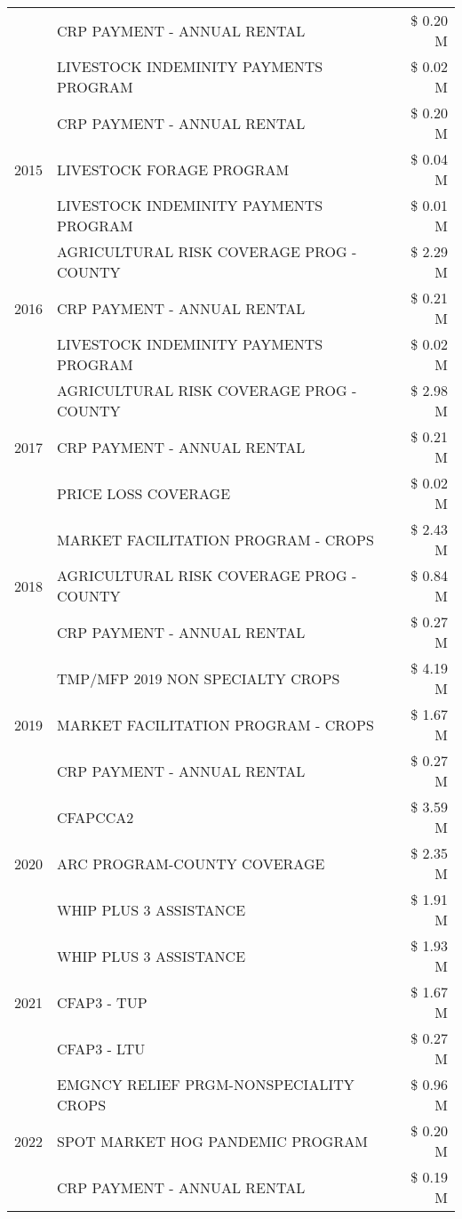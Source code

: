\begin{tabular}{llr}
 & CRP PAYMENT - ANNUAL RENTAL & \$ 0.20 M \\
 & LIVESTOCK INDEMINITY PAYMENTS PROGRAM & \$ 0.02 M \\
\cline{1-3}
\multirow[t]{3}{*}{2015} & CRP PAYMENT - ANNUAL RENTAL & \$ 0.20 M \\
 & LIVESTOCK FORAGE PROGRAM & \$ 0.04 M \\
 & LIVESTOCK INDEMINITY PAYMENTS PROGRAM & \$ 0.01 M \\
\cline{1-3}
\multirow[t]{3}{*}{2016} & AGRICULTURAL RISK COVERAGE PROG - COUNTY & \$ 2.29 M \\
 & CRP PAYMENT - ANNUAL RENTAL & \$ 0.21 M \\
 & LIVESTOCK INDEMINITY PAYMENTS PROGRAM & \$ 0.02 M \\
\cline{1-3}
\multirow[t]{3}{*}{2017} & AGRICULTURAL RISK COVERAGE PROG - COUNTY & \$ 2.98 M \\
 & CRP PAYMENT - ANNUAL RENTAL & \$ 0.21 M \\
 & PRICE LOSS COVERAGE & \$ 0.02 M \\
\cline{1-3}
\multirow[t]{3}{*}{2018} & MARKET FACILITATION PROGRAM - CROPS & \$ 2.43 M \\
 & AGRICULTURAL RISK COVERAGE PROG - COUNTY & \$ 0.84 M \\
 & CRP PAYMENT - ANNUAL RENTAL & \$ 0.27 M \\
\cline{1-3}
\multirow[t]{3}{*}{2019} & TMP/MFP 2019 NON SPECIALTY CROPS & \$ 4.19 M \\
 & MARKET FACILITATION PROGRAM - CROPS & \$ 1.67 M \\
 & CRP PAYMENT - ANNUAL RENTAL & \$ 0.27 M \\
\cline{1-3}
\multirow[t]{3}{*}{2020} & CFAPCCA2 & \$ 3.59 M \\
 & ARC PROGRAM-COUNTY COVERAGE & \$ 2.35 M \\
 & WHIP PLUS 3 ASSISTANCE & \$ 1.91 M \\
\cline{1-3}
\multirow[t]{3}{*}{2021} & WHIP PLUS 3 ASSISTANCE & \$ 1.93 M \\
 & CFAP3 - TUP & \$ 1.67 M \\
 & CFAP3 - LTU & \$ 0.27 M \\
\cline{1-3}
\multirow[t]{3}{*}{2022} & EMGNCY RELIEF PRGM-NONSPECIALITY CROPS & \$ 0.96 M \\
 & SPOT MARKET HOG PANDEMIC PROGRAM & \$ 0.20 M \\
 & CRP PAYMENT - ANNUAL RENTAL & \$ 0.19 M \\
\cline{1-3}
\bottomrule
\end{tabular}
